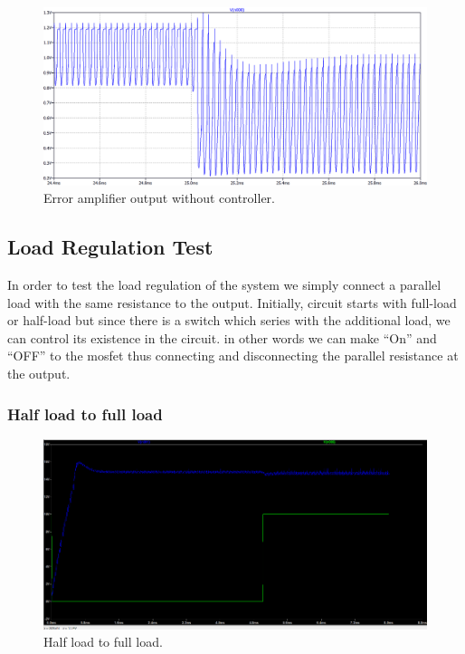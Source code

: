 \documentclass{article}
\begin{document}
\begin{figure}[H]
    \centering
    \includegraphics[scale=0.4]{24 to 48 v input(controlcu kullanmadan)(error amplifier output voltage.png}
    \caption{Error amplifier output without controller.}
    \label{fig:my_label}
\end{figure}

\subsection{Load Regulation Test}
  In order to test the load regulation of the system we simply connect a parallel load with the same resistance to the output. Initially, circuit starts with full-load or half-load but since there is a switch which series with the additional load, we can control its existence in the circuit. in other words we can make “On” and “OFF” to the mosfet thus connecting and disconnecting the parallel resistance at the output.
\subsubsection{Half load to full load}

\begin{figure}[H]
    \centering
    \includegraphics[scale=0.7]{e1.png}
    \caption{Half load to full load.}
    \label{fig:my_label}
\end{figure}
\end{document}
